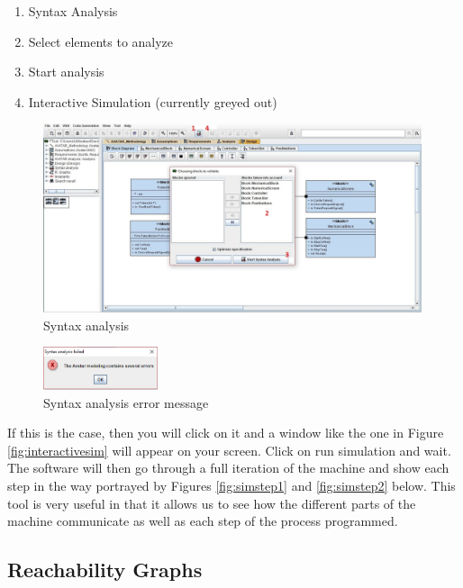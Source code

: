 \documentclass[12pt]{article}
\begin{document}
\begin{enumerate}
\item Syntax Analysis
\item Select elements to analyze
\item Start analysis
\item Interactive Simulation (currently greyed out)


\end{enumerate}
\begin{figure}[htbp]
\centering
\includegraphics[width=0.99\textwidth]{fig/syntaxanalysis.jpg}
\caption{Syntax analysis} \label{fig:syntaxanalysis}
\end{figure}


\begin{figure}[htbp]
\centering
\includegraphics[width=0.3\textwidth]{fig/syntaxerror.png}
\caption{Syntax analysis error message} \label{fig:syntaxerror}
\end{figure}

	If this is the case, then you will click on it and a window like the one in Figure \ref{fig:interactivesim} will appear on your screen. Click on run simulation and wait. The software will then go through a full iteration of the machine and show each step in the way portrayed by Figures \ref{fig:simstep1} and \ref{fig:simstep2} below. This tool is very useful in that it allows us to see how the different parts of the machine communicate as well as each step of the process programmed.
\subsection{Reachability Graphs}
\end{document}
